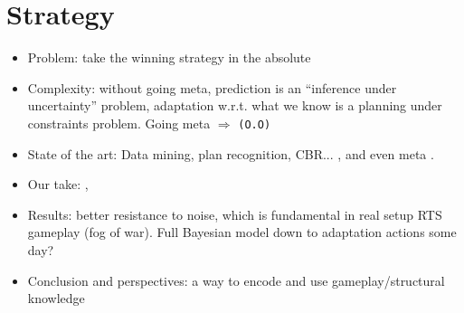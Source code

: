 \chapter{Strategy}
\begin{itemize}
\item Problem: take the winning strategy in the absolute
\item Complexity: without going meta, prediction is an ``inference under uncertainty'' problem, adaptation w.r.t. what we know is a planning under constraints problem. Going meta $\Rightarrow$ \texttt{(O.O)}
\item State of the art: Data mining, plan recognition, CBR... \citep{weberStrat}, \citep{Weber2010qf} and even meta \citep{metalevelbehavioradaptrts}.
\item Our take: \citep{SYNNAEVE:OpeningPred}, \citep{SYNNAEVE:StratPred}
\item Results: better resistance to noise, which is fundamental in real setup RTS gameplay (fog of war). Full Bayesian model down to adaptation actions some day?
\item Conclusion and perspectives: a way to encode and use gameplay/structural knowledge 
\end{itemize}


